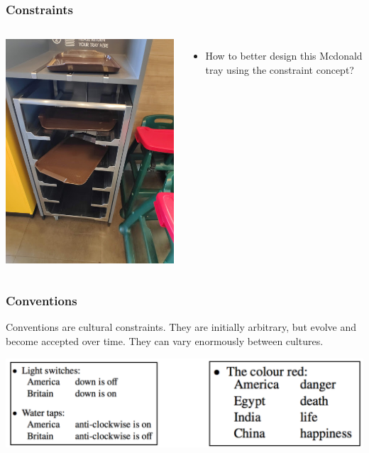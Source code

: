 \documentclass{beamer}
\begin{document}
\begin{frame}
\frametitle{Constraints}
\begin{columns}[c] %
	
	\centering
	\includegraphics[width=0.7\linewidth]{mc}
	
	\begin{itemize}
		\item How to better design this Mcdonald tray using the constraint concept?
	\end{itemize}
\end{columns}
\end{frame}

%	

\begin{frame}
\frametitle{Conventions}
Conventions are cultural constraints.  They are initially arbitrary, but evolve and become accepted over time.   They can vary enormously between cultures. \vfill

\centering
\includegraphics[width=0.9\linewidth]{convention}
\end{frame}
\end{document}
